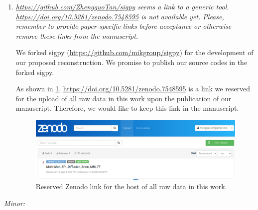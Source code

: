 \documentclass[a4paper,11pt,twoside]{report}
\begin{document}
\begin{enumerate}
    \item \textit{\url{https://github.com/ZhengguoTan/sigpy} seems a link to a generic tool. \url{https://doi.org/10.5281/zenodo.7548595} is not available yet. Please, remember to provide paper-specific links before acceptance or otherwise remove these links from the manuscript.}

    \hspace{1em} We forked sigpy (\url{https://github.com/mikgroup/sigpy}) for the development of
    our proposed reconstruction. We promise to publish our source codes in the forked sigpy.

    \hspace{1em} As shown in \cref{FIG:Zenodo},
    \url{https://doi.org/10.5281/zenodo.7548595} is a link we reserved
    for the upload of all raw data in this work
    upon the publication of our manuscript.
    Therefore, we would like to keep this link in the manuscript.

    \begin{figure}[ht]
        \centering
        \includegraphics[width=\textwidth]{fig_zenodo.png}
        \caption{Reserved Zenodo link for the host of all raw data in this work.}
        \label{FIG:Zenodo}
    \end{figure}
\end{enumerate}


\noindent \textit{Minor:}
\end{document}
